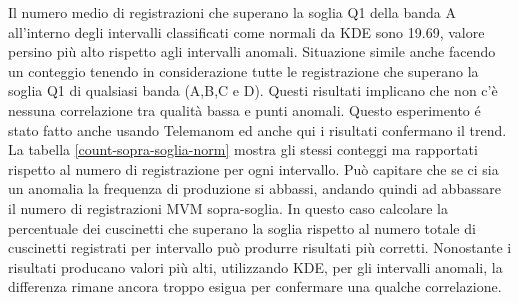 Il numero medio di registrazioni che superano la soglia Q1 della banda A all'interno degli intervalli classificati come normali da KDE sono 19.69, valore persino più alto rispetto agli intervalli anomali. Situazione simile anche facendo un conteggio tenendo in considerazione tutte le registrazione che superano la soglia Q1 di qualsiasi banda (A,B,C e D). Questi risultati implicano che non c'è nessuna correlazione tra qualità bassa e punti anomali. 
Questo esperimento é stato fatto anche usando Telemanom ed anche qui i risultati confermano il trend.
La tabella \ref{count-sopra-soglia-norm} mostra gli stessi conteggi ma rapportati rispetto al numero di registrazione per ogni intervallo. Può capitare che se ci sia un anomalia la frequenza di produzione si abbassi, andando quindi ad abbassare il numero di registrazioni MVM sopra-soglia. In questo caso calcolare la percentuale dei cuscinetti che superano la soglia rispetto al numero totale di cuscinetti registrati per intervallo può produrre risultati più corretti. 
Nonostante i risultati producano valori più alti, utilizzando KDE, per gli intervalli anomali, la differenza rimane ancora troppo esigua per confermare una qualche correlazione. 

\begin{table}[ht]
\centering
{}
\caption{\label{count-sopra-soglia}Numero medio di cuscinetti sopra-soglia per intervallo}
\end{table}


